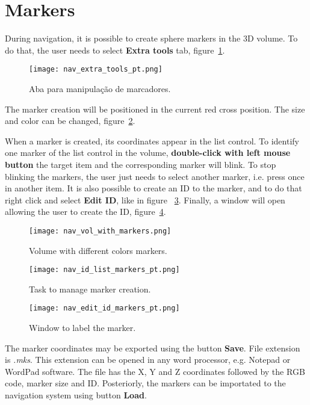 \section{Markers}

During navigation, it is possible to create sphere markers in the 3D volume. To do that, the user needs to select
\textbf{Extra tools} tab, figure~\ref{fig:nav_extra_tools}.

\begin{figure}[!htb]
\centering
\texttt{[image: nav\_extra\_tools\_pt.png]}
\caption{Aba para manipulação de marcadores.}
\label{fig:nav_extra_tools}
\end{figure}

The marker creation will be positioned in the current red cross position. The size and color can be
changed, figure~\ref{fig:nav_vol_with_markers}.

When a marker is created, its coordinates appear in the list control. To identify one marker of the list control in the
volume, \textbf{double-click with left mouse button} the target item and the corresponding marker will blink.
To stop blinking the markers, the user just needs to select another marker, i.e. press once in another item.
It is also possible to create an ID to the marker, and to do that right click and select \textbf{Edit ID}, like
in figure ~\ref{fig:nav_id_list_markers}. Finally, a window will open allowing the user to create
the ID, figure~\ref{fig:nav_edit_id_markers}.

\begin{figure}[!htb]
\centering
\texttt{[image: nav\_vol\_with\_markers.png]}
\caption{Volume with different colors markers.}
\label{fig:nav_vol_with_markers}
\end{figure} 

\begin{figure}[!htb]
\centering
\texttt{[image: nav\_id\_list\_markers\_pt.png]}
\caption{Task to manage marker creation.}
\label{fig:nav_id_list_markers}
\end{figure} 

\begin{figure}[!htb]
\centering
\texttt{[image: nav\_edit\_id\_markers\_pt.png]}
\caption{Window to label the marker.}
\label{fig:nav_edit_id_markers}
\end{figure} 

The marker coordinates may be exported using the button \textbf{Save}. File extension is \textit{.mks}. This extension can be
opened in any word processor, e.g. Notepad or WordPad software. The file has the X, Y and Z coordinates followed by the RGB code,
marker size and ID. Posteriorly, the markers can be importated to the navigation system using button \textbf{Load}.

